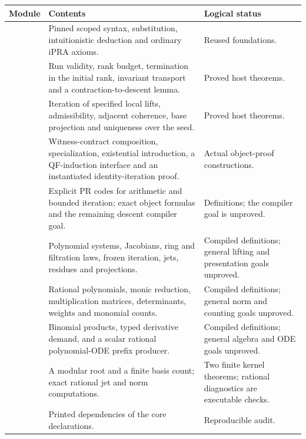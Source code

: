 \begin{longtable}{P{.27\linewidth}P{.43\linewidth}P{.21\linewidth}}
\toprule
Module & Contents & Logical status\\
\midrule\endhead
{\footnotesize{}} & Pinned scoped syntax, substitution,
intuitionistic deduction and ordinary iPRA axioms. & Reused foundations.\\[3pt]
{\footnotesize{}} & Run validity, rank budget, termination in the
initial rank, invariant transport and a contraction-to-descent lemma.
& Proved host theorems.\\[3pt]
{\footnotesize{}} & Iteration of specified local lifts,
admissibility, adjacent coherence, base projection and uniqueness over
the seed. & Proved host theorems.\\[3pt]
{\footnotesize{}} & Witness-contract composition,
specialization, existential introduction, a QF-induction interface and
an instantiated identity-iteration proof. & Actual object-proof
constructions.\\[3pt]
{\footnotesize{}} & Explicit PR codes for arithmetic and bounded
iteration; exact object formulas and the remaining descent compiler
goal. & Definitions; the compiler goal is unproved.\\[3pt]
{\footnotesize{}} & Polynomial systems, Jacobians, ring and
filtration laws, frozen iteration, jets, residues and projections.
& Compiled definitions; general lifting and presentation goals unproved.\\[3pt]
{\footnotesize{}} & Rational polynomials, monic reduction,
multiplication matrices, determinants, weights and monomial counts.
& Compiled definitions; general norm and counting goals unproved.\\[3pt]
{\footnotesize{}} & Binomial products, typed derivative demand,
and a scalar rational polynomial-ODE prefix producer.
& Compiled definitions; general algebra and ODE goals unproved.\\[3pt]
{\footnotesize{}} & A modular root and a finite basis count;
exact rational jet and norm computations. & Two finite kernel theorems;
rational diagnostics are executable checks.\\[3pt]
{\footnotesize{}} & Printed dependencies of the core declarations.
& Reproducible audit.\\
\bottomrule
\end{longtable}

